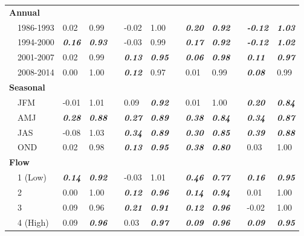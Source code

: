 \documentclass{svjour3}\usepackage[]{graphicx}\usepackage[]{color}
\begin{document}
\begin{table}[!tbp]
\begin{center}
\begin{tabular}{lllcllcllcll}
\hline
{\bfseries Annual}&&&&&&&&&&&\tabularnewline
~~1986-1993&0.02&0.99&&-0.02&1.00&&{\bf \textit{0.20}}&{\bf \textit{0.92}}&&{\bf \textit{-0.12}}&{\bf \textit{1.03}}\tabularnewline
~~1994-2000&{\bf \textit{0.16}}&{\bf \textit{0.93}}&&-0.03&0.99&&{\bf \textit{0.17}}&{\bf \textit{0.92}}&&{\bf \textit{-0.12}}&{\bf \textit{1.02}}\tabularnewline
~~2001-2007&0.02&0.99&&{\bf \textit{0.13}}&{\bf \textit{0.95}}&&{\bf \textit{0.06}}&{\bf \textit{0.98}}&&{\bf \textit{0.11}}&{\bf \textit{0.97}}\tabularnewline
~~2008-2014&0.00&1.00&&{\bf \textit{0.12}}&0.97&&0.01&0.99&&{\bf \textit{0.08}}&0.99\tabularnewline
\hline
{\bfseries Seasonal}&&&&&&&&&&&\tabularnewline
~~JFM&-0.01&1.01&&0.09&{\bf \textit{0.92}}&&0.01&1.00&&{\bf \textit{0.20}}&{\bf \textit{0.84}}\tabularnewline
~~AMJ&{\bf \textit{0.28}}&{\bf \textit{0.88}}&&{\bf \textit{0.27}}&{\bf \textit{0.89}}&&{\bf \textit{0.38}}&{\bf \textit{0.84}}&&{\bf \textit{0.34}}&{\bf \textit{0.87}}\tabularnewline
~~JAS&-0.08&1.03&&{\bf \textit{0.34}}&{\bf \textit{0.89}}&&{\bf \textit{0.30}}&{\bf \textit{0.85}}&&{\bf \textit{0.39}}&{\bf \textit{0.88}}\tabularnewline
~~OND&0.02&0.98&&{\bf \textit{0.13}}&{\bf \textit{0.95}}&&{\bf \textit{0.38}}&{\bf \textit{0.80}}&&0.03&1.00\tabularnewline
\hline
{\bfseries Flow}&&&&&&&&&&&\tabularnewline
~~1 (Low)&{\bf \textit{0.14}}&{\bf \textit{0.92}}&&-0.03&1.01&&{\bf \textit{0.46}}&{\bf \textit{0.77}}&&{\bf \textit{0.16}}&{\bf \textit{0.95}}\tabularnewline
~~2&0.00&1.00&&{\bf \textit{0.12}}&{\bf \textit{0.96}}&&{\bf \textit{0.14}}&{\bf \textit{0.94}}&&0.01&1.00\tabularnewline
~~3&0.09&0.96&&{\bf \textit{0.21}}&{\bf \textit{0.91}}&&{\bf \textit{0.12}}&{\bf \textit{0.96}}&&-0.02&1.00\tabularnewline
~~4 (High)&0.09&{\bf \textit{0.96}}&&0.03&{\bf \textit{0.97}}&&{\bf \textit{0.09}}&{\bf \textit{0.96}}&&{\bf \textit{0.09}}&{\bf \textit{0.95}}\tabularnewline
\hline
\end{tabular}\end{center}

\end{table}
\end{document}
